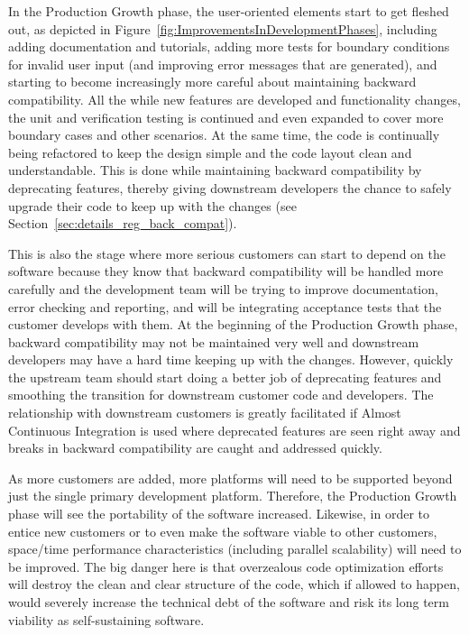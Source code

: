 \documentclass[11pt]{SANDreport}
\begin{document}
In the Production Growth phase, the user-oriented elements start to
get fleshed out, as depicted in
Figure~\ref{fig:ImprovementsInDevelopmentPhases}, including adding
documentation and tutorials, adding more tests for boundary conditions
for invalid user input (and improving error messages that are
generated), and starting to become increasingly more careful about
maintaining backward compatibility.  All the while new features are
developed and functionality changes, the unit and verification testing
is continued and even expanded to cover more boundary cases and other
scenarios.  At the same time, the code is continually being refactored
to keep the design simple and the code layout clean and
understandable.  This is done while maintaining backward compatibility
by deprecating features, thereby giving downstream developers the
chance to safely upgrade their code to keep up with the changes (see
Section~\ref{sec:details_reg_back_compat}).

This is also the stage where more serious customers can start to
depend on the software because they know that backward compatibility
will be handled more carefully and the development team will be trying
to improve documentation, error checking and reporting, and will be
integrating acceptance tests that the customer develops with them.  At
the beginning of the Production Growth phase, backward compatibility
may not be maintained very well and downstream developers may have a
hard time keeping up with the changes.  However, quickly the upstream
team should start doing a better job of deprecating features and
smoothing the transition for downstream customer code and developers.
The relationship with downstream customers is greatly facilitated if
Almost Continuous Integration {}\cite{SoftwareIntegrationforCSE09} is
used where deprecated features are seen right away and breaks in
backward compatibility are caught and addressed quickly.

As more customers are added, more platforms will need to be supported
beyond just the single primary development platform.  Therefore, the
Production Growth phase will see the portability of the software
increased.  Likewise, in order to entice new customers or to even make
the software viable to other customers, space/time performance
characteristics (including parallel scalability) will need to be
improved.  The big danger here is that overzealous code optimization
efforts will destroy the clean and clear structure of the code, which
if allowed to happen, would severely increase the technical debt of
the software and risk its long term viability as self-sustaining
software.
\end{document}
